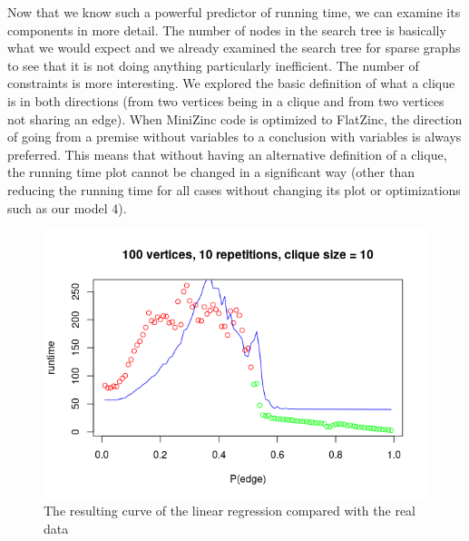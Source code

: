 \documentclass{article}
\begin{document}
Now that we know such a powerful predictor of running time, we can examine its components in more detail. The number of nodes in the search tree is basically what we would expect and we already examined the search tree for sparse graphs to see that it is not doing anything particularly inefficient. The number of constraints is more interesting. We explored the basic definition of what a clique is in both directions (from two vertices being in a clique and from two vertices not sharing an edge). When MiniZinc code is optimized to FlatZinc, the direction of going from a premise without variables to a conclusion with variables is always preferred. This means that without having an alternative definition of a clique, the running time plot cannot be changed in a significant way (other than reducing the running time for all cases without changing its plot or optimizations such as our model 4).
\begin{figure}
  \includegraphics[scale=0.5]{regression.png}
  \caption{The resulting curve of the linear regression compared with the real data}
  \label{fig:regression}
\end{figure}
\end{document}
